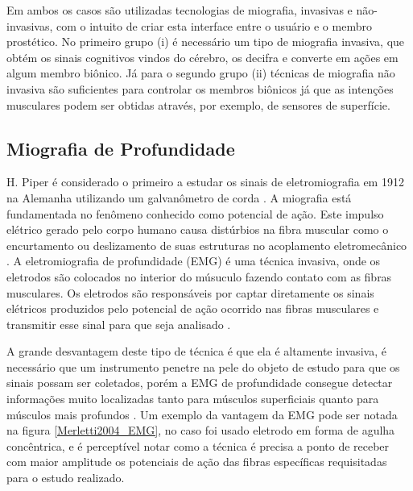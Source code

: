 Em ambos os casos são utilizadas tecnologias de miografia, invasivas e não-invasivas, com o intuito de criar esta interface entre o usuário e o membro prostético. No primeiro grupo (i) é necessário um tipo de miografia invasiva, que obtém os sinais cognitivos vindos do cérebro, os decifra e converte em ações em algum membro biônico. Já para o segundo grupo (ii) técnicas de miografia não invasiva são suficientes para controlar os membros biônicos já que as intenções musculares podem ser obtidas através, por exemplo, de sensores de superfície.


\subsection{Miografia de Profundidade}\label{cap2:sub2.1}

H. Piper é considerado o primeiro a estudar os sinais de eletromiografia em 1912 na Alemanha utilizando um galvanômetro de corda \cite{merletti2004electromyography}. A miografia está fundamentada no fenômeno conhecido como potencial de ação. Este impulso elétrico gerado pelo corpo humano causa distúrbios na fibra muscular como o encurtamento ou deslizamento de suas estruturas no acoplamento eletromecânico \cite{rodriguez2000eletromiografia}. A eletromiografia de profundidade (EMG) é uma técnica invasiva, onde os eletrodos são colocados no interior do músuculo fazendo contato com as fibras musculares. Os eletrodos são responsáveis por captar diretamente os sinais elétricos produzidos pelo potencial de ação ocorrido nas fibras musculares e transmitir esse sinal para que seja analisado \cite{merletti2004electromyography}. 

A grande desvantagem deste tipo de técnica é que ela é altamente invasiva, é necessário que um instrumento penetre na pele do objeto de estudo para que os sinais possam ser coletados, porém a EMG de profundidade consegue detectar informações muito localizadas tanto para músculos superficiais quanto para músculos mais profundos \cite{merletti2004electromyography}. Um exemplo da vantagem da EMG pode ser notada na figura \ref{Merletti2004_EMG}, no caso foi usado eletrodo em forma de agulha concêntrica, e é perceptível notar como a técnica é precisa a ponto de receber com maior amplitude os potenciais de ação das fibras específicas requisitadas para o estudo realizado.
 
